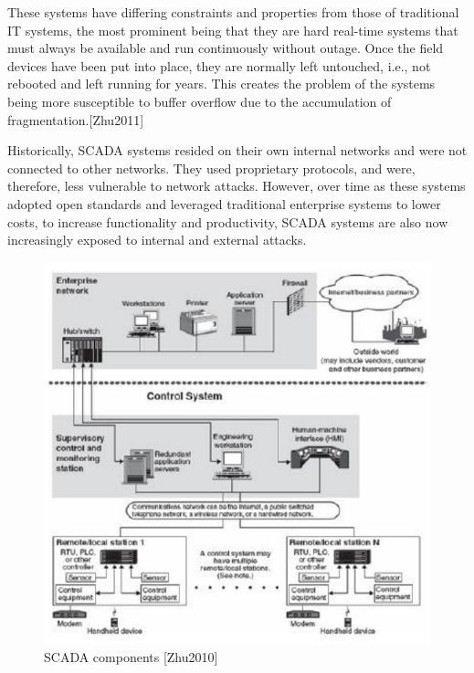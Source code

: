 \documentclass[12pt,]{article}
\begin{document}
These systems have differing constraints and properties from those of
traditional IT systems, the most prominent being that they are hard
real-time systems that must always be available and run continuously
without outage. Once the field devices have been put into place, they
are normally left untouched, i.e., not rebooted and left running for
years. This creates the problem of the systems being more susceptible to
buffer overflow due to the accumulation of fragmentation.{[}Zhu2011{]}

Historically, SCADA systems resided on their own internal networks and
were not connected to other networks. They used proprietary protocols,
and were, therefore, less vulnerable to network attacks. However, over
time as these systems adopted open standards and leveraged traditional
enterprise systems to lower costs, to increase functionality and
productivity, SCADA systems are also now increasingly exposed to
internal and external attacks.

\begin{figure}

{\centering \includegraphics{test2_files/figure-latex/unnamed-chunk-2-1} 

}

\caption{SCADA components [Zhu2010]}\label{fig:unnamed-chunk-2}
\end{figure}
\end{document}
